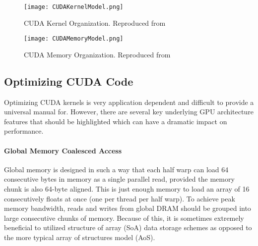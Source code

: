 \begin{figure}[h]
    \centering
    \texttt{[image: CUDAKernelModel.png]}
    \caption{CUDA Kernel Organization. Reproduced from \cite{cudadocumentation}}
    \label{fig:kernelorganization}
\end{figure}

\begin{figure}[h]
    \centering
    \texttt{[image: CUDAMemoryModel.png]}
    \caption{CUDA Memory Organization. Reproduced from \cite{gep3d}}
    \label{fig:cudamemoryorganization}
\end{figure}

\subsection{Optimizing CUDA Code}
Optimizing CUDA kernels is very application dependent and difficult to provide a universal manual for. However, there are several key underlying GPU architecture features that should be highlighted which can have a dramatic impact on performance.
\paragraph{Global Memory Coalesced Access} Global memory is designed in such a way that each half warp can load 64 consecutive bytes in memory as a single parallel read, provided the memory chunk is also 64-byte aligned. This is just enough memory to load an array of 16 consecutively floats at once (one per thread per half warp). To achieve peak memory bandwidth, reads and writes from global DRAM should be grouped into large consecutive chunks of memory. Because of this, it is sometimes extremely beneficial to utilized structure of array (SoA) data storage schemes as opposed to the more typical array of structures model (AoS).
